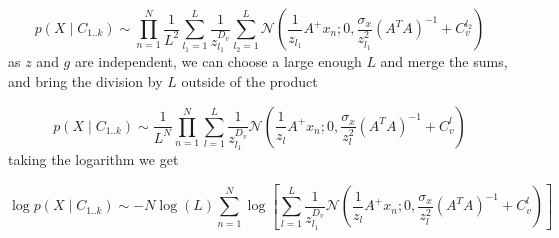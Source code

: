 \documentclass{paper}
\begin{document}
\begin{equation}
p(X \mid C_{1..k}) \sim \prod_{n=1}^N  \frac{1}{L^2} \sum_{l_1=1}^L \frac{1}{z_{l_1}^{D_v}}  \sum_{l_2=1}^L \mathcal{N}(\frac{1}{z_{l_1}} A^{+}x_n; 0,\frac{\sigma_x}{z_{l_1}^2} (A^T A)^{-1} + C_v^{l_2})
\end{equation}
% 
as $z$ and $g$ are independent, we can choose a large enough $L$ and merge the sums, and bring the division by $L$ outside of the product

\begin{equation}
p(X \mid C_{1..k}) \sim \frac{1}{L^N} \prod_{n=1}^N  \sum_{l=1}^L \frac{1}{z_{l_1}^{D_v}}  \mathcal{N}(\frac{1}{z_l} A^{+}x_n; 0,\frac{\sigma_x}{z_l^2} (A^T A)^{-1} + C_v^l)
\end{equation}
%
taking the logarithm we get

\begin{equation}
\log p(X \mid C_{1..k}) \sim - N \log(L) \sum_{n=1}^N \log \left[ \sum_{l=1}^L \frac{1}{z_{l_1}^{D_v}}  \mathcal{N}(\frac{1}{z_l} A^{+}x_n; 0,\frac{\sigma_x}{z_l^2} (A^T A)^{-1} + C_v^l) \right]
\end{equation}
\end{document}
